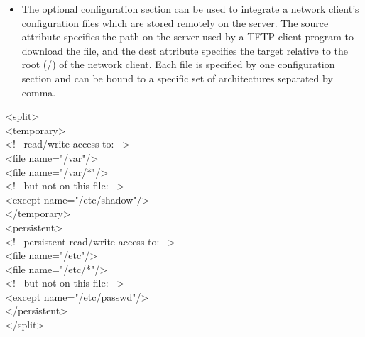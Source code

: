 \begin {itemize}
      mapper setup with the dmsquash type. In this case, KIWI creates an
      additional write partition, then
      combines both partitions with the given overlay filesystem or device map.
      Currently, there are two such filesystems: unionfs and aufs
      (aufs is the preferred file system). The partition that holds the
      read-only system image must be set as the ro attribute value, and the
      partition that serves as the write partition must be set the rw
      attribute value.
\item The optional configuration section can be used to integrate a network
      client's configuration files which are stored remotely on the server.
      The source attribute specifies the path on the server used by a
      TFTP client program to download the file, and the dest attribute
      specifies the target relative to the root (/) of the network client.
      Each file is specified by one configuration section and can be
      bound to a specific set of architectures separated by comma.
\end{itemize}

\newpage

\begin{Command}{12cm}
<split>\\
\hspace*{1cm}<temporary>\\
\hspace*{2cm}<!-- read/write access to: -->\\
\hspace*{2cm}<file name="/var"/>\\
\hspace*{2cm}<file name="/var/*"/>\\
\hspace*{2cm}<!-- but not on this file: -->\\
\hspace*{2cm}<except name="/etc/shadow"/>\\
\hspace*{1cm}</temporary>\\
\hspace*{1cm}<persistent>\\
\hspace*{2cm}<!-- persistent read/write access to: -->\\
\hspace*{2cm}<file name="/etc"/>\\
\hspace*{2cm}<file name="/etc/*"/>\\
\hspace*{2cm}<!-- but not on this file: -->\\
\hspace*{2cm}<except name="/etc/passwd"/>\\
\hspace*{1cm}</persistent>\\
</split>
\end{Command}

